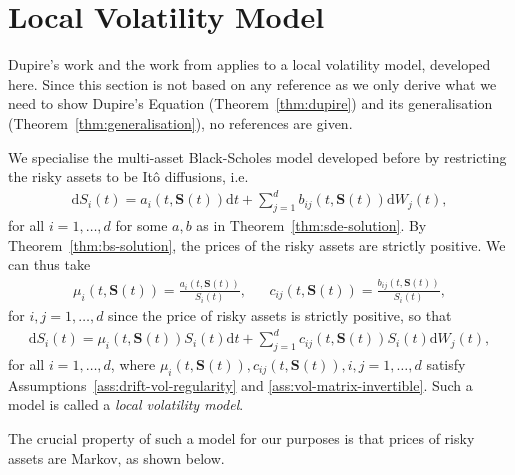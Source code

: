 \documentclass[english]{article}
\numberwithin{equation}{section}
\numberwithin{figure}{section}
\theoremstyle{bolddescit}
\theoremstyle{definition}
\theoremstyle{definition}
\theoremstyle{plain}
\theoremstyle{plain}
\theoremstyle{bolddesc}
\theoremstyle{plain}
\theoremstyle{remark}
\begin{document}
\section{Local Volatility Model}\label{sec:local-vol}

Dupire's work and the work from \textcite{amster_towards_2009} applies to a local volatility model, developed here. Since this section is not based on any reference as we only derive what we need to show Dupire's Equation (Theorem~\ref{thm:dupire}) and its generalisation (Theorem~\ref{thm:generalisation}), no references are given.

We specialise the multi-asset Black-Scholes model developed before by restricting the risky assets to be It\^o diffusions, i.e.
\begin{align*}
  \mathrm{d}S_i(t) = a_i(t,\mathbf{S}(t)) \mathrm{d}t + \sum_{j=1}^{d} b_{ij}(t,\mathbf{S}(t)) \mathrm{d}W_j(t),
\end{align*}
for all $i=1,\ldots,d$ for some $a,b$ as in Theorem~\ref{thm:sde-solution}. By Theorem~\ref{thm:bs-solution}, the prices of the risky assets are strictly positive. We can thus take
\begin{align*}
  \mu_i(t,\mathbf{S}(t)) = \frac{a_i(t, \mathbf{S}(t))}{S_i(t)},
  && c_{ij}(t,\mathbf{S}(t)) = \frac{b_{ij}(t, \mathbf{S}(t))}{S_i(t)},
\end{align*}
for $i,j=1,\ldots,d$ since the price of risky assets is strictly positive, so that
\begin{align}\label{eq:local-dynamics}
  \mathrm{d}S_i(t) = \mu_i(t,\mathbf{S}(t)) S_i(t) \mathrm{d}t + \sum_{j=1}^{d} c_{ij}(t,\mathbf{S}(t)) S_i(t) \mathrm{d}W_j(t),
\end{align}
for all $i=1,\ldots,d$, where $\mu_i(t,\mathbf{S}(t)), c_{ij}(t,\mathbf{S}(t)), i,j=1,\ldots,d$ satisfy Assumptions~\ref{ass:drift-vol-regularity} and \ref{ass:vol-matrix-invertible}. Such a model is called a \textit{local volatility model}.

The crucial property of such a model for our purposes is that prices of risky assets are Markov, as shown below.
\end{document}

